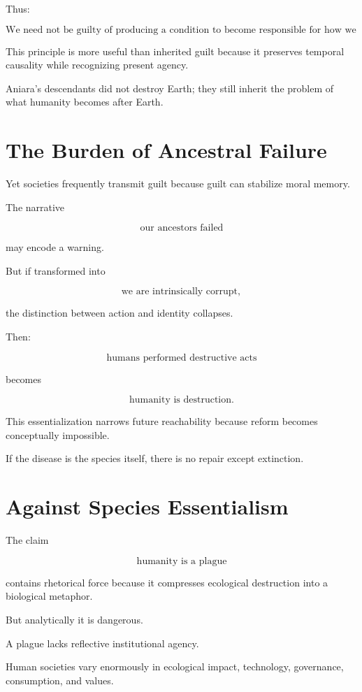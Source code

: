 \documentclass[11pt,oneside]{book}
\theoremstyle{definition}
\theoremstyle{remark}
\begin{document}
Thus:

\[
\boxed{
\text{We need not be guilty of producing a condition to become responsible for how we continue from it.}
}
\]

This principle is more useful than inherited guilt because it preserves temporal causality while recognizing present agency.

Aniara's descendants did not destroy Earth; they still inherit the problem of what humanity becomes after Earth.

\section{The Burden of Ancestral Failure}

Yet societies frequently transmit guilt because guilt can stabilize moral memory.

The narrative

\[
\text{our ancestors failed}
\]

may encode a warning.

But if transformed into

\[
\text{we are intrinsically corrupt},
\]

the distinction between action and identity collapses.

Then:

\[
\text{humans performed destructive acts}
\]

becomes

\[
\text{humanity is destruction}.
\]

This essentialization narrows future reachability because reform becomes conceptually impossible.

If the disease is the species itself, there is no repair except extinction.

\section{Against Species Essentialism}

The claim

\[
\text{humanity is a plague}
\]

contains rhetorical force because it compresses ecological destruction into a biological metaphor.

But analytically it is dangerous.

A plague lacks reflective institutional agency.

Human societies vary enormously in ecological impact, technology, governance, consumption, and values.
\end{document}
